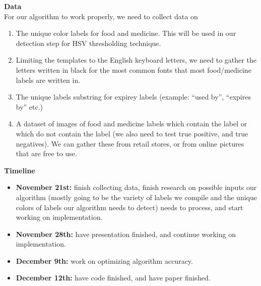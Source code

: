 \documentclass[12pt]{article}
\begin{document}
\textbf{Data} \\
For our algorithm to work properly, we need to collect data on
\begin{enumerate}
    \item The unique color labels for food and medicine. This will be used
    in our detection step for HSV thresholding technique.
    \item Limiting the templates to the English keyboard letters, we need to
    gather the letters written in black for the most common
    fonts that most food/medicine labels are written in.
    \item The unique labels substring for expirey labels (example: ``used by'', ``expires by'' etc.)
    \item A dataset of images of food and medicine labels which contain
    the label or which do not contain the label (we also need to test true positive,
    and true negatives). We can gather these from retail stores, or from
    online pictures that are free to use.
\end{enumerate}
\textbf{Timeline}
\begin{itemize}
    \item \textbf{November 21st:} finish collecting data, finish research on
    possible inputs our algorithm (mostly going to be
    the variety of labels we compile and the unique colors of
    labels our algorithm needs to detect) needs to process,
    and start working on implementation.
    \item \textbf{November 28th:} have presentation finished, and
    continue working on implementation.
    \item \textbf{December 9th:} work
    on optimizing algorithm accuracy.
    \item \textbf{December 12th:} have code finished, and have paper finished.
\end{itemize}
\end{document}
